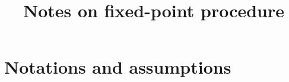 \documentclass{article}
\title{Notes on fixed-point procedure}
\author{}
\date{}
\numberwithin{equation}{section}
\newcommand{\mysubeq}[2]{ %
	\begin{subequations}\label{#1}
		\begin{align}[left = {\empheqlbrace}]
			#2
		\end{align}
	\end{subequations}	
}
\begin{document}
\maketitle

%
%

\tableofcontents


\section{Notations and assumptions}
\end{document}
